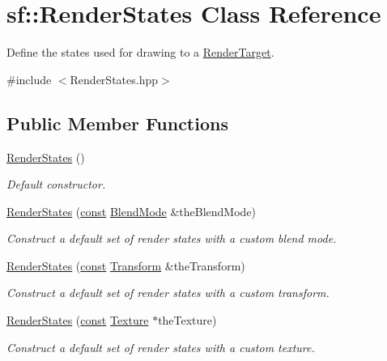 \hypertarget{classsf_1_1_render_states}{\section{sf\-:\-:Render\-States Class Reference}
\label{classsf_1_1_render_states}
}


Define the states used for drawing to a \hyperlink{classsf_1_1_render_target}{Render\-Target}.  




{\ttfamily \#include $<$Render\-States.\-hpp$>$}

\subsection*{Public Member Functions}
\begin{DoxyCompactItemize}
\item 
\hyperlink{classsf_1_1_render_states_a885bf14070d0d5391f062f62b270b7d0}{Render\-States} ()
\begin{DoxyCompactList}\small\item\em Default constructor. \end{DoxyCompactList}\item 
\hyperlink{classsf_1_1_render_states_acac8830a593c8a4523ac2fdf3cac8a01}{Render\-States} (\hyperlink{term__entry_8h_a57bd63ce7f9a353488880e3de6692d5a}{const} \hyperlink{structsf_1_1_blend_mode}{Blend\-Mode} \&the\-Blend\-Mode)
\begin{DoxyCompactList}\small\item\em Construct a default set of render states with a custom blend mode. \end{DoxyCompactList}\item 
\hyperlink{classsf_1_1_render_states_a3e99cad6ab05971d40357949930ed890}{Render\-States} (\hyperlink{term__entry_8h_a57bd63ce7f9a353488880e3de6692d5a}{const} \hyperlink{classsf_1_1_transform}{Transform} \&the\-Transform)
\begin{DoxyCompactList}\small\item\em Construct a default set of render states with a custom transform. \end{DoxyCompactList}\item 
\hyperlink{classsf_1_1_render_states_a8f4ca3be0e27dafea0c4ab8547439bb1}{Render\-States} (\hyperlink{term__entry_8h_a57bd63ce7f9a353488880e3de6692d5a}{const} \hyperlink{classsf_1_1_texture}{Texture} $\ast$the\-Texture)
\begin{DoxyCompactList}\small\item\em Construct a default set of render states with a custom texture. \end{DoxyCompactList}\item 

\end{DoxyCompactItemize}
